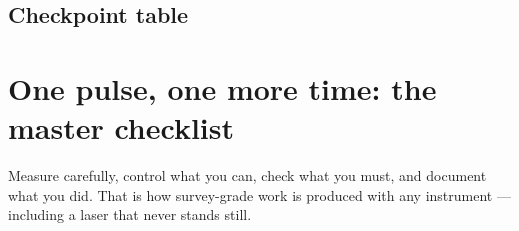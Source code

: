 \subsection*{Checkpoint table}


\section{One pulse, one more time: the master checklist}

\begin{bigidea}
Measure carefully, control what you can, check what you must, and document what you did. That is how survey-grade work is produced with any instrument --- including a laser that never stands still.
\end{bigidea}
